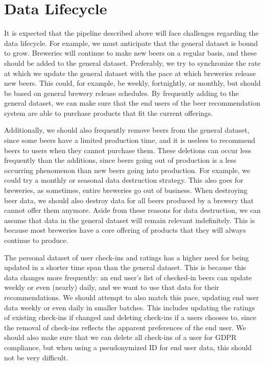 \documentclass[sigconf]{acmart}
\begin{document}
\section{Data Lifecycle}
It is expected that the pipeline described above will face challenges regarding the data lifecycle.
For example, we must anticipate that the general dataset is bound to grow.
Breweries will continue to make new beers on a regular basis, and these should be added to the general dataset.
Preferably, we try to synchronize the rate at which we update the general dataset with the pace at which breweries release new beers.
This could, for example, be weekly, fortnightly, or monthly, but should be based on general brewery release schedules.
By frequently adding to the general dataset, we can make sure that the end users of the beer recommendation system are able to purchase products that fit the current offerings.

Additionally, we should also frequently remove beers from the general dataset, since some beers have a limited production time, and it is useless to recommend beers to users when they cannot purchase them.
These deletions can occur less frequently than the additions, since beers going out of production is a less occurring phenomenon than new beers going into production.
For example, we could try a monthly or seasonal data destruction strategy.
This also goes for breweries, as sometimes, entire breweries go out of business.
When destroying beer data, we should also destroy data for all beers produced by a brewery that cannot offer them anymore.
Aside from these reasons for data destruction, we can assume that data in the general dataset will remain relevant indefinitely.
This is because most breweries have a core offering of products that they will always continue to produce.

The personal dataset of user check-ins and ratings has a higher need for being updated in a shorter time span than the general dataset.
This is because this data changes more frequently: an end user's list of checked-in beers can update weekly or even (nearly) daily, and we want to use that data for their recommendations.
We should attempt to also match this pace, updating end user data weekly or even daily in smaller batches.
This includes updating the ratings of existing check-ins if changed and deleting check-ins if a users chooses to, since the removal of check-ins reflects the apparent preferences of the end user.
We should also make sure that we can delete all check-ins of a user for GDPR compliance, but when using a pseudonymized ID for end user data, this should not be very difficult.
\end{document}
